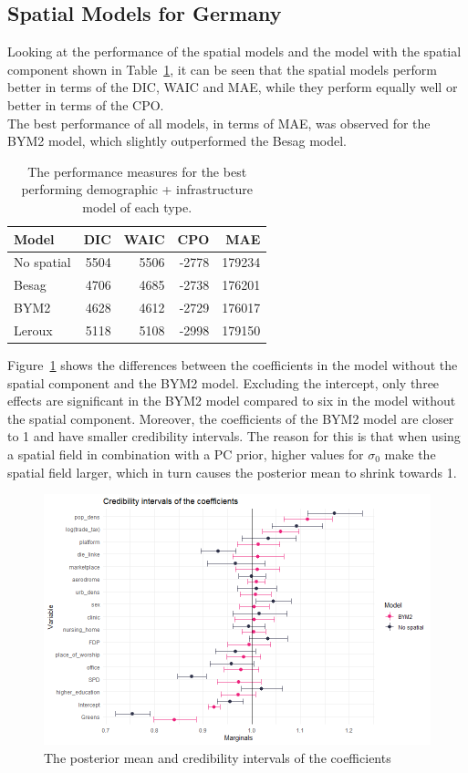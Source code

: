 \subsection{Spatial Models for Germany}
Looking at the performance of the spatial models and the model with the spatial component shown in Table~\ref{allGermany}, it can be seen that the spatial models perform better in terms of the DIC, WAIC and MAE, while they perform equally well or better in terms of the CPO. \\
The best performance of all models, in terms of MAE, was observed for the BYM2 model, which slightly outperformed the Besag model.
\begin{table}[H] 
\caption{The performance measures for the best performing demographic + infrastructure model of each type. \label{allGermany}}
\begin{tabular}{l r r r r}
\toprule
\textbf{Model}	& \textbf{DIC}	& \textbf{WAIC} & \textbf{CPO} & \textbf{MAE}\\
\midrule
No spatial & 5504 & 5506 & -2778 & 179234 \\
Besag&  4706 & 4685 & -2738 & 176201\\
BYM2 & 4628 & 4612 & -2729 & 176017\\
Leroux & 5118 & 5108 & -2998 & 179150 \\
\bottomrule
\end{tabular}
\end{table}
Figure~\ref{intervalGermany} shows the differences between the coefficients in the model without the spatial component and the BYM2 model. Excluding the intercept, only three effects are significant in the BYM2 model compared to six in the model without the spatial component. Moreover, the coefficients of the BYM2 model are closer to 1 and have smaller credibility intervals. The reason for this is that when using a spatial field in combination with a PC prior, higher values for $\sigma_0$ make the spatial field larger, which in turn causes the posterior mean to shrink towards 1.
\begin{figure}[H]
    \centering
    \includegraphics[width = \textwidth]{intervals_germany.png}
    \caption{The posterior mean and credibility intervals of the coefficients}
    \label{intervalGermany}
\end{figure}
